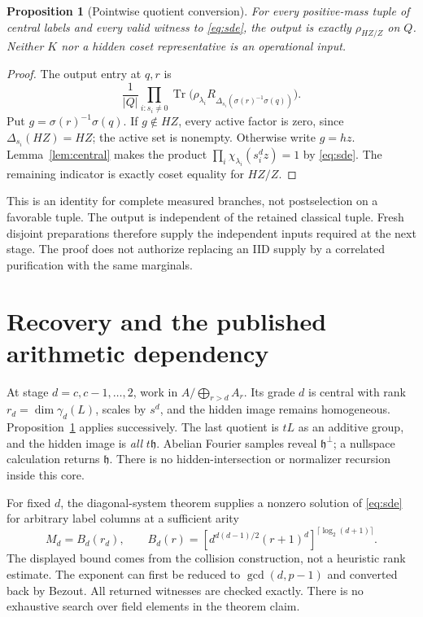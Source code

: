 \documentclass[11pt]{article}
\newtheorem{proposition}[theorem]{Proposition}
\theoremstyle{remark}
\newcommand{\tr}{\operatorname{Tr}}
\begin{document}
\begin{proposition}[Pointwise quotient conversion]\label{prop:descent}
For every positive-mass tuple of central labels and every valid witness
to \eqref{eq:sde}, the output is exactly $\rho_{HZ/Z}$ on $Q$.
Neither $K$ nor a hidden coset representative is an operational input.
\end{proposition}
\begin{proof}
The output entry at $q,r$ is
\[
 \frac1{|Q|}\prod_{i:s_i\ne0}
 \tr\bigl(\rho_{\lambda_i}
 R_{\Delta_{s_i}(\sigma(r)^{-1}\sigma(q))}\bigr).
\]
Put $g=\sigma(r)^{-1}\sigma(q)$. If $g\notin HZ$, every active factor
is zero, since $\Delta_{s_i}(HZ)=HZ$; the active set is nonempty.
Otherwise write $g=hz$. Lemma~\ref{lem:central} makes the product
$\prod_i\chi_{\lambda_i}(s_i^d z)=1$ by \eqref{eq:sde}.
The remaining indicator is exactly coset equality for $HZ/Z$.
\end{proof}

This is an identity for complete measured branches, not postselection on
a favorable tuple. The output is independent of the retained classical
tuple. Fresh disjoint preparations therefore supply the independent
inputs required at the next stage. The proof does not authorize replacing
an IID supply by a correlated purification with the same marginals.

\section{Recovery and the published arithmetic dependency}
At stage $d=c,c-1,\ldots,2$, work in
$A/\bigoplus_{r>d}A_r$. Its grade $d$ is central with rank
$r_d=\dim\gamma_d(L)$, scales by $s^d$, and the hidden image remains
homogeneous. Proposition~\ref{prop:descent} applies successively.
The last quotient is $tL$ as an additive group, and the hidden image is
\emph{all} $t\mathfrak h$. Abelian Fourier samples reveal
$\mathfrak h^\perp$; a nullspace calculation returns $\mathfrak h$.
There is no hidden-intersection or normalizer recursion inside this core.

For fixed $d$, the diagonal-system theorem \cite[Sections 3.1--3.3]{is}
supplies a nonzero solution of \eqref{eq:sde} for arbitrary label columns
at a sufficient arity
\[
 M_d=B_d(r_d),\qquad
 B_d(r)=\left[d^{d(d-1)/2}(r+1)^d\right]^{\lceil\log_2(d+1)\rceil}.
\]
The displayed bound comes from the collision construction, not a heuristic
rank estimate. The exponent can first be reduced to $\gcd(d,p-1)$ and
converted back by Bezout. All returned witnesses are checked exactly.
There is no exhaustive search over field elements in the theorem claim.
\end{document}
